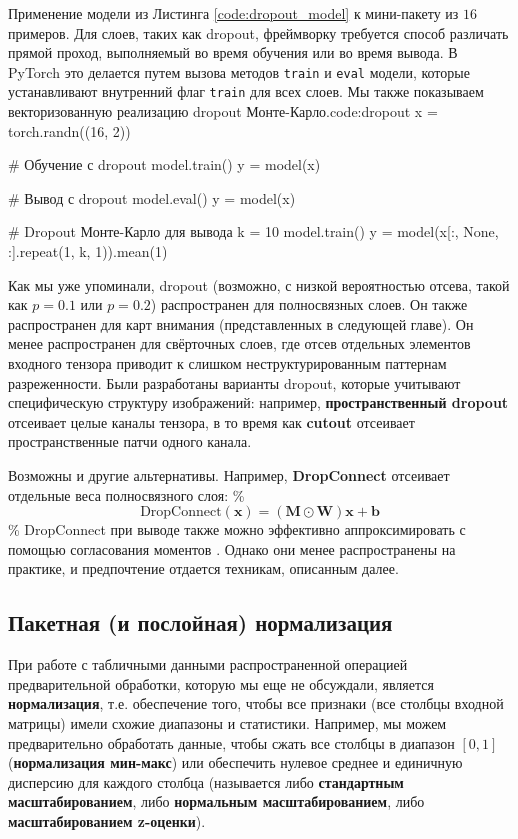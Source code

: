 \begin{mypy}{Применение модели из Листинга \ref{code:dropout_model} к мини-пакету из $16$ примеров. Для слоев, таких как dropout, фреймворку требуется способ различать прямой проход, выполняемый во время обучения или во время вывода. В PyTorch это делается путем вызова методов {\footnotesize\texttt{train}} и {\footnotesize\texttt{eval}} модели, которые устанавливают внутренний флаг {\footnotesize\texttt{train}} для всех слоев. Мы также показываем векторизованную реализацию dropout Монте-Карло.}{code:dropout}
x = torch.randn((16, 2))

# Обучение с dropout
model.train()
y = model(x)

# Вывод с dropout
model.eval()
y = model(x)

# Dropout Монте-Карло для вывода
k = 10
model.train()
y = model(x[:, None, :].repeat(1, k, 1)).mean(1)
\end{mypy}

Как мы уже упоминали, dropout (возможно, с низкой вероятностью отсева, такой как $p=0.1$ или $p=0.2$) распространен для полносвязных слоев. Он также распространен для карт внимания (представленных в следующей главе). Он менее распространен для свёрточных слоев, где отсев отдельных элементов входного тензора приводит к слишком неструктурированным паттернам разреженности. Были разработаны варианты dropout, которые учитывают специфическую структуру изображений: например, \textbf{пространственный dropout} \cite{tompson2015efficient} отсеивает целые каналы тензора, в то время как \textbf{cutout} \cite{devries2017improved} отсеивает пространственные патчи одного канала.

Возможны и другие альтернативы. Например, \textbf{DropConnect} \cite{wan2013regularization} отсеивает отдельные веса полносвязного слоя:
\%
$$
\text{DropConnect}(\mathbf{x})=(\mathbf{M}\odot\mathbf{W})\mathbf{x}+\mathbf{b}
$$
\%
DropConnect при выводе также можно эффективно аппроксимировать с помощью согласования моментов \cite{wan2013regularization}. Однако они менее распространены на практике, и предпочтение отдается техникам, описанным далее.

\subsection{Пакетная (и послойная) нормализация} \addclock

При работе с табличными данными распространенной операцией предварительной обработки, которую мы еще не обсуждали, является \textbf{нормализация}, т.е. обеспечение того, чтобы все признаки (все столбцы входной матрицы) имели схожие диапазоны и статистики. Например, мы можем предварительно обработать данные, чтобы сжать все столбцы в диапазон $[0,1]$ (\textbf{нормализация мин-макс}) или обеспечить нулевое среднее и единичную дисперсию для каждого столбца (называется либо \textbf{стандартным масштабированием}, либо \textbf{нормальным масштабированием}, либо \textbf{масштабированием z-оценки}).

